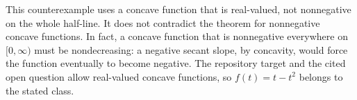 \begin{remark}
This counterexample uses a concave function that is real-valued, not nonnegative on the whole half-line. It does not contradict the theorem for nonnegative concave functions. In fact, a concave function that is nonnegative everywhere on $[0,\infty)$ must be nondecreasing: a negative secant slope, by concavity, would force the function eventually to become negative. The repository target and the cited open question allow real-valued concave functions, so $f(t)=t-t^2$ belongs to the stated class.
\end{remark}

